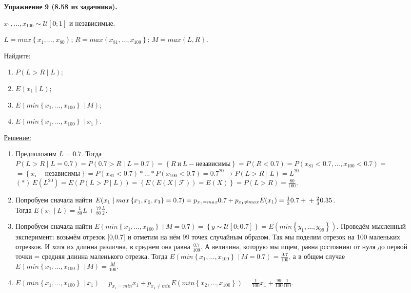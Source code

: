 \documentclass[a4paper]{article}
\begin{document}
\par {\bf\underline{Упражнение 9 (8.58 из задачника).}}
\\
\par{$x_{1},\ldots, x_{100} \sim \mathcal{U}[0;1]$ и независимые.

$L = max\left \{  x_{1},\ldots, x_{80}\right \}$;
$R = max\left \{  x_{81},\ldots, x_{100}\right \}$;
$M = max\left \{L,R\right \}$.}

Найдите:
\begin{enumerate}
\item $P(L>R\mid L)$;

\item $E(x_{1}\mid L)$;

\item $E(min\left \{  x_{1},\ldots, x_{100}\right \}\mid M)$;

\item $E(min\left \{  x_{1},\ldots, x_{100}\right \}\mid x_{1})$.
\end{enumerate}
\par{\underline{Решение:}}
\begin{enumerate}
\item Предположим $L=0.7$. Тогда $P(L>R\mid L=0.7) = P(0.7>R\mid L=0.7) = \left \{R\  \text{и} \ L - \text{независимы}  \right \} = P(R<0.7)= P(x_{81}<0.7,\ldots, x_{100}<0.7)=$\\$
=\left \{  x_{i} - \text{независимы}\right \} = P(x_{81}<0.7) * \ldots  * P(x_{100}<0.7) = 0.7^{20} \rightarrow P(L>R\mid L) = L^{20}$ \\
$(*) \ E(L^{20})=E(P(L>P\mid L))=\left \{ E(E(X\mid \mathcal{F}))=E(X) \right \}=P(L>R)=\frac{80}{100}$.

\item Попробуем сначала найти $E(x_{1}\mid max\left \{x_{1},x_{2},x_{3}  \right \} = 0.7)= p_{x_{1}=max}0.7+p_{x_{1}\neq max}E(x_{1}) =\frac{1}{3}0.7+ \\ +\frac{2}{3}0.35$.
\\Тогда $E(x_{1}\mid L) =\frac{1}{80}L+\frac{79}{80}\frac{L}{2}$.

\item Попробуем сначала найти $E(min\left \{  x_{1},\ldots, x_{100}\right \}\mid M = 0.7) =  \left \{  y \sim \mathcal{U}[0;0.7] \right \}=E(min\left \{y_{1},\ldots, y_{99}\right \})$. Проведём мысленный эксперимент: возьмём отрезок [0,0.7] и отметим на нём 99 точек случайным образом. Так мы поделим отрезок на 100 маленьких отрезков. И хотя их длинна различна, в среднем она равна $\frac{0.7}{100}$. А величина, которую мы ищем, равна рсстоянию от нуля до первой точки = средняя длинна маленького отрезка. Тогда $E(min\left \{  x_{1},\ldots, x_{100}\right \}\mid M = 0.7) = \frac{0.7}{100}$, а в общем случае $E(min\left \{  x_{1},\ldots, x_{100}\right \}\mid M) = \frac{M}{100}$.
\item $E(min\left\{x_{1},\ldots, x_{100} \right\} \mid x_{1})= p_{x_{1}=min}x_{1} + p_{x_{1}\neq min}E(min \left \{x_{2},\ldots, x_{100}  \right \}) = \frac{1}{100}x_{1} + \frac{99}{100}\frac{1}{100}$.
\end{enumerate}
\end{document}
